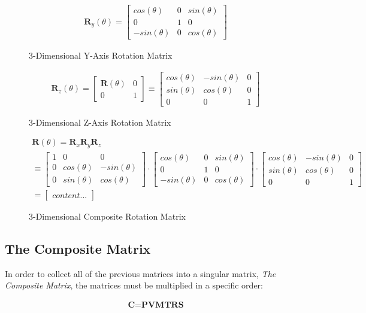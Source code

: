 \begin{figure}[h!]
\begin{gather} 
\textbf{R}_y(\theta) = 
\begin{bmatrix}
cos(\theta) & 0 & sin(\theta) \\
0 & 1 & 0\\
-sin(\theta) & 0 & cos(\theta)
\end{bmatrix}
\end{gather}
\label{equation:3dYRotMat} 
\caption{3-Dimensional Y-Axis Rotation Matrix}
\end{figure}

\begin{figure}[h!]
\begin{gather} 
\textbf{R}_z(\theta) = 
\begin{bmatrix}
\textbf{R}(\theta) & 0 \\
0 & 1
\end{bmatrix}
\equiv
\begin{bmatrix}
cos(\theta) & -sin(\theta) & 0 \\
sin(\theta) & cos(\theta) & 0 \\
0 & 0 & 1
\end{bmatrix}
\end{gather}
\label{equation:3dZRotMat} 
\caption{3-Dimensional Z-Axis Rotation Matrix}
\end{figure}

\begin{figure}[h!]
\begin{gather}
\textbf{R}(\theta) = \textbf{R}_x\textbf{R}_y\textbf{R}_z
\\
\equiv
\begin{bmatrix}
1 & 0 & 0 \\
0 & cos(\theta) & -sin(\theta)\\
0 & sin(\theta) & cos(\theta) 
\end{bmatrix}
\cdot
\begin{bmatrix}
cos(\theta) & 0 & sin(\theta) \\
0 & 1 & 0\\
-sin(\theta) & 0 & cos(\theta)
\end{bmatrix}
\cdot
\begin{bmatrix}
cos(\theta) & -sin(\theta) & 0 \\
sin(\theta) & cos(\theta) & 0 \\
0 & 0 & 1
\end{bmatrix}
\\
=
\begin{bmatrix}
content...
\end{bmatrix}
\end{gather}
\label{equation:3dRotMat}	
\caption{3-Dimensional Composite Rotation Matrix}
\end{figure}

\subsection{The Composite Matrix}
In order to collect all of the previous matrices into a singular matrix, \textit{The Composite Matrix}, the matrices must be multiplied in a specific order:

\begin{figure}[h!]
\begin{gather}
\textbf{C} = \textbf{PVMTRS}
\end{gather}	
\end{figure}